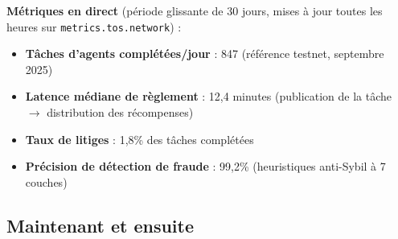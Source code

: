 \documentclass[11pt]{article}
\begin{document}
\textbf{Métriques en direct} (période glissante de 30 jours, mises à jour toutes les heures sur \texttt{metrics.tos.network}) :
\begin{itemize}[noitemsep]
  \item \textbf{Tâches d'agents complétées/jour} : 847 (référence testnet, septembre 2025)
  \item \textbf{Latence médiane de règlement} : 12,4 minutes (publication de la tâche $\rightarrow$ distribution des récompenses)
  \item \textbf{Taux de litiges} : 1,8\% des tâches complétées
  \item \textbf{Précision de détection de fraude} : 99,2\% (heuristiques anti-Sybil à 7 couches)
\end{itemize}

\subsection{Maintenant et ensuite}
\end{document}
